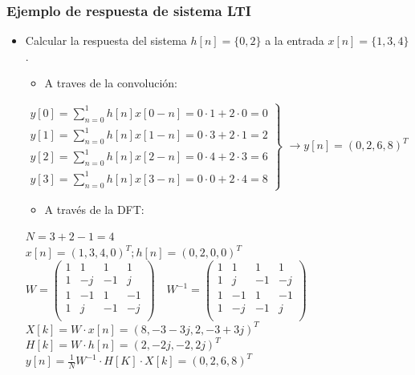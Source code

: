 \documentclass{beamer}
\numberwithin{section}{part}
\begin{document}
  
\begin{frame}
  \frametitle{Ejemplo de respuesta de sistema LTI}
  
  \footnotesize
  \begin{itemize}
    \item \color{olivegreen}Calcular la respuesta del sistema $h[n]=\{0,2\}$ a la entrada  $x[n]=\{1,3,4\}$.\color{gray}
    \begin{itemize}
      \item \color{black}A traves de la convolución:\color{gray}
    \end{itemize}

    \scriptsize
    $\left . \!\!\!\!\! \begin{array}{l} y[0]=\sum_{n=0}^{1}h[n]x[0-n]=0\cdot 1 + 2 \cdot 0=0\\
    y[1]=\sum_{n=0}^{1}h[n]x[1-n]=0\cdot 3 + 2 \cdot 1=2\\
    y[2]=\sum_{n=0}^{1}h[n]x[2-n]=0\cdot 4+ 2 \cdot 3=6\\
    y[3]=\sum_{n=0}^{1}h[n]x[3-n]=0\cdot 0 + 2 \cdot 4=8\end{array}\!\!\right\}$ $\rightarrow y[n]=(0,2,6,8)^T$
  
    \begin{itemize}
      \item \color{black}A través de la DFT:\color{gray}
    \end{itemize}
      
      \scriptsize 
      $N=3+2-1=4$\\[1ex]
      $x[n]=(1,3,4,0)^T ; h[n]=(0,2,0,0)^T$\\[1ex]
      $W=\begin{pmatrix} 
        1 &  1 &  1 &  1 \\
        1 & -j & -1 &  j \\
        1 & -1 &  1 & -1 \\
        1 &  j & -1 & -j \\
      \end{pmatrix}
      \quad
      W^{-1}=\begin{pmatrix} 
        1 &  1 &  1 &  1 \\
        1 &  j & -1 & -j \\
        1 & -1 &  1 & -1 \\
        1 & -j & -1 &  j \\
      \end{pmatrix}$\\[1ex]      
      $X[k]=W\cdot x[n]=\left(8, -3-3j, 2, -3+3j\right)^T$\\[1ex]
      $H[k]=W\cdot h[n]=\left(2, -2j, -2, 2j\right)^T$\\[1ex]
      $y[n]=\frac{1}{N}W^{-1}\cdot H[K]\cdot X[k]=(0,2,6,8)^T$
  \end{itemize}
\end{frame}
\end{document}
